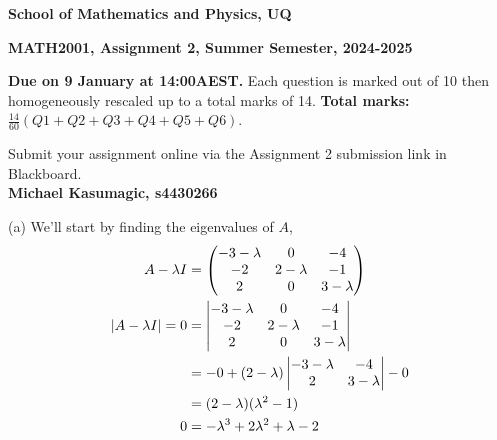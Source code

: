 \documentclass[a4paper,12pt]{report}
\begin{document}
\begin{center}
{\bf School of Mathematics and Physics, UQ}
\end{center}
\centerline{\large\bf MATH2001, Assignment 2, Summer Semester, 2024-2025}

\vspace{3mm}

{\bf Due on 9 January at 14:00AEST.} Each question is marked out of 10 then homogeneously rescaled up to a total marks of 14. {\bf Total marks: $\frac{14}{60}(Q1+Q2+Q3+Q4+Q5+Q6) $}. 

Submit your assignment online via the Assignment 2 submission link in Blackboard. \\
\textbf{Michael Kasumagic, s4430266}

\sol (a)
We'll start by finding the eigenvalues of $A$,
\begin{align*}
  A - \lambda I &= \begin{pmatrix} -3-\lambda & 0 & -4 \\ -2 & 2-\lambda & -1 \\ 2 & 0 & 3-\lambda \end{pmatrix} \\
  \left| A - \lambda I \right| = 0 &= \begin{vmatrix} -3-\lambda & 0 & -4 \\ -2 & 2-\lambda & -1 \\ 2 & 0 & 3-\lambda \end{vmatrix} \\
    &= -0 +(2-\lambda)\begin{vmatrix} -3-\lambda & -4 \\ 2 & 3 - \lambda \end{vmatrix} - 0 \\
    &= (2-\lambda)(\lambda^2-1)\\
  0 &= -\lambda^3 + 2\lambda^2 + \lambda - 2
\end{align*}
\end{document}
